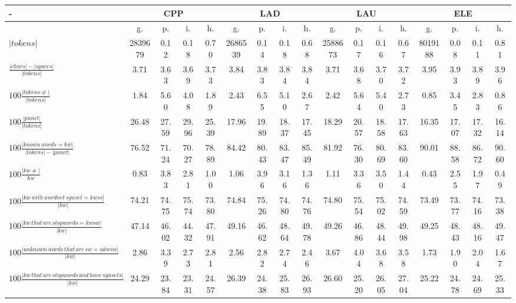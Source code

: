 \documentclass[%
 aip,
 jmp,%
 amsmath,amssymb,
 reprint,%
 floatfix,
]{revtex4-1}
\begin{document}
\begin{table}
  \centering
    \footnotesize
\setlength{\tabcolsep}{.056667em}
  \begin{tabular}{|l|| c|c|c|c||  c|c|c|c||   c|c|c|c||   c|c|c|c|}\hline
-\-  & \multicolumn{4}{c|}{CPP} & \multicolumn{4}{c|}{LAD} & \multicolumn{4}{c|}{LAU} & \multicolumn{4}{c|}{ELE} \\ \hline
 & g. & p. & i. & h. &     g. & p. & i. & h. &    g. & p. & i. & h. &    g. & p. & i. & h. \\\hline
$|tokens|$ & 2839679  & 0.12 & 0.18 & 0.70 & 2686539  & 0.14 & 0.18 & 0.68 & 2588673  & 0.17 & 0.16 & 0.67 & 8019188  & 0.08 & 0.11 & 0.81 \\\hline
$\frac{|chars|-|spaces|}{|tokens|}$ & 3.71 & 3.63 & 3.69 & 3.73 & 3.84 & 3.83 & 3.84 & 3.84 & 3.71 & 3.68 & 3.70 & 3.72 & 3.95 & 3.93 & 3.89 & 3.96 \\\hline
$100\frac{|tokens \neq|}{|tokens|}$ & 1.84 & 5.60 & 4.08 & 1.89 & 2.43 & 6.55 & 5.10 & 2.67 & 2.42 & 5.64 & 5.40 & 2.73 & 0.85 & 3.45 & 2.83 & 0.86 \\\hline
$100\frac{|punct|}{|tokens|}$ & 26.48 & 27.59 & 29.96 & 25.39 & 17.96 & 19.89 & 18.37 & 17.45 & 18.29 & 20.57 & 18.58 & 17.63 & 16.35 & 17.07 & 17.32 & 16.14 \\\hline
$100\frac{|known\,words=kw|}{|tokens| - |punct|}$ & 76.52 & 71.24 & 70.27 & 78.89 & 84.42 & 80.43 & 83.47 & 85.49 & 81.92 & 76.30 & 80.69 & 83.60 & 90.01 & 88.58 & 86.72 & 90.60 \\\hline
$100\frac{|kw\neq|}{kw}$ & 0.83 & 3.83 & 2.81 & 1.00 & 1.06 & 3.96 & 3.16 & 1.36 & 1.11 & 3.36 & 3.50 & 1.44 & 0.43 & 2.55 & 1.97 & 0.49 \\\hline
$100\frac{|kw\,with\,wordnet\,synset=kwss|}{|kw|}$ & 74.21 & 74.75 & 75.74 & 73.80 & 74.84 & 75.26 & 74.80 & 74.76 & 74.80 & 75.54 & 75.02 & 74.59 & 73.49 & 73.77 & 74.16 & 73.38 \\\hline
100$\frac{|kw\,that\,are\,stopwords=kwsw|}{|kw|}$ & 47.14 & 46.02 & 44.32 & 47.91 & 49.16 & 46.62 & 48.64 & 49.78 & 49.26 & 46.86 & 48.44 & 49.98 & 49.25 & 48.43 & 48.16 & 49.47 \\\hline
$100\frac{|unknown\,words\,that\,are\,sw=ukwsw|}{|kw|}$ & 2.86 & 3.39 & 2.73 & 2.81 & 2.56 & 2.82 & 2.74 & 2.46 & 3.67 & 4.04 & 3.68 & 3.58 & 1.73 & 1.90 & 2.04 & 1.67 \\\hline
$100\frac{|kw\,that\, are\, stopwords\,and\,have\,synsets|}{|kw|}$ & 24.29 & 23.84 & 23.31 & 24.57 & 26.39 & 24.38 & 25.83 & 26.93 & 26.60 & 25.20 & 26.05 & 27.04 & 25.22 & 24.78 & 24.69 & 25.33 \\\hline

\end{tabular}
\end{table}
\end{document}
